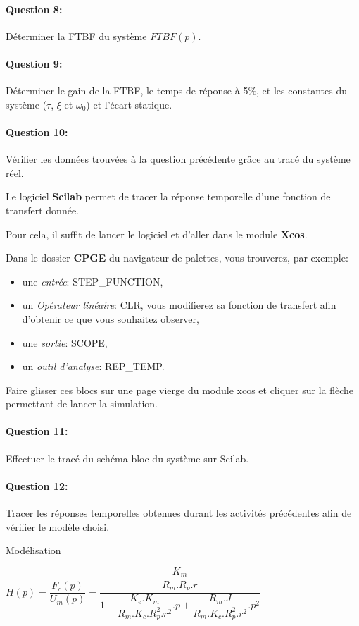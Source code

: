 \paragraph{Question 8:} Déterminer la FTBF du système $FTBF(p)$.

\paragraph{Question 9:} Déterminer le gain de la FTBF, le temps de réponse à 5\%, et les constantes du système ($\tau$, $\xi$ et $\omega_0$) et l'écart statique.

\paragraph{Question 10:} Vérifier les données trouvées à la question précédente grâce au tracé du système réel.
 
\ifdef{\public}{\cleardoublepage}{}


Le logiciel \textbf{Scilab} permet de tracer la réponse temporelle d'une fonction de transfert donnée.

Pour cela, il suffit de lancer le logiciel et d'aller dans le module \textbf{Xcos}.

Dans le dossier \textbf{CPGE} du navigateur de palettes, vous trouverez, par exemple:
\begin{itemize}
 \item une \textit{entrée}: STEP\_FUNCTION,
 \item un \textit{Opérateur linéaire}: CLR, vous modifierez sa fonction de transfert afin d'obtenir ce que vous souhaitez observer,
 \item une \textit{sortie}: SCOPE,
 \item un \textit{outil d'analyse}: REP\_TEMP.
\end{itemize}

Faire glisser ces blocs sur une page vierge du module xcos et cliquer sur la flèche permettant de lancer la simulation.

\paragraph{Question 11:} Effectuer le tracé du schéma bloc du système sur Scilab.

\paragraph{Question 12:} Tracer les réponses temporelles obtenues durant les activités précédentes afin de vérifier le modèle choisi.

\ifdef{\public}{}{}

\newpage

\pagestyle{correction}\setcounter{section}{0}

Modélisation
\begin{center}
$H(p)=\dfrac{F_c(p)}{U_m(p)}=\dfrac{\dfrac{K_m}{R_m.R_p.r}}{1+\dfrac{K_e.K_m}{R_m.K_c.R_p^2.r^2}.p+\dfrac{R_m.J}{R_m.K_c.R_p^2.r^2}.p^2}$
\end{center}

